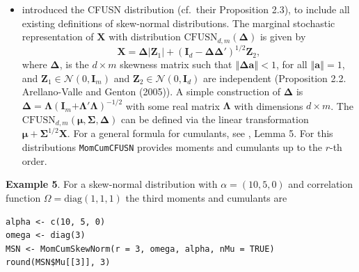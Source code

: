 \begin{itemize}
\[{  }\right)  \right)  , \quad\mathbf{X} \in\mathbb{R}^{d},
  \]
  where \(\varphi\left(\mathbf{X};\boldsymbol{\mu},\boldsymbol{\Omega}\right)\) is the \(d\)-dimensional normal density with mean \(\boldsymbol{\mu}\)
  and correlation matrix \(\boldsymbol{\Omega}\); here \(\varphi\) and \(\Phi\) denote
  the univariate standard normal density and the cdf. For a general formula for cumulants, see \citet{jamma2021San}, Lemma 4. For this distribution are available the functions \texttt{MomCumSkewNorm}, which computes the theoretical values of moments and cumulants up to the r-th order and \texttt{EVSKSkewNorm} which gives mean vector, covariance, skewness and kurtosis vectors and other features.
\item
  \citet{arellano2005fundamental} introduced the
  CFUSN distribution (cf.~their Proposition 2.3), to include all
  existing definitions of skew-normal distributions. The marginal stochastic
  representation of \(\mathbf{X}\) with distribution \(\text{CFUSN}_{d,m}\left(\boldsymbol{\Delta}\right)\) is given by
  \[
    \mathbf{X}=\boldsymbol{\Delta}\left\vert \mathbf{Z}_{1}\right\vert
    +\left(  \mathbf{I}_{d}-\boldsymbol{\Delta\Delta}'\right)
    ^{1/2}\mathbf{Z}_{2}, 
  \]
  where \(\boldsymbol{\Delta}\), is the \(d\times m\) skewness matrix such that
  \(\left\Vert \boldsymbol{\Delta}\mathbf{a}\right\Vert <1\), for all
  \(\left\Vert \mathbf{a}\right\Vert =1\), and \(\mathbf{Z}_{1}\in\mathcal{N}\left( 0,\mathbf{I}_{m}\right)\) and \(\mathbf{Z}_{2}\in\mathcal{N}\left( 0,\mathbf{I}_{d}\right)\) are independent (Proposition 2.2. Arellano-Valle and Genton (2005)). A simple construction of
  \(\boldsymbol{\Delta}\) is \(\boldsymbol{\Delta}=\boldsymbol{\Lambda}\left(\mathbf{I}_{m}\mathbf{+}\boldsymbol{\Lambda}' \boldsymbol{\Lambda}\right)^{-1/2}\) with some real matrix \(\boldsymbol{\Lambda}\) with dimensions \(d\times m\). The \(\text{CFUSN}_{d,m}\left(\boldsymbol{\mu},\boldsymbol{\Sigma},\boldsymbol{\Delta}\right)\) can be defined via the linear transformation
  \(\boldsymbol{\mu}+\boldsymbol{\Sigma}^{1/2}\mathbf{X}\). For a general formula for cumulants, see \citet{jamma2021San}, Lemma 5. For this distributions \texttt{MomCumCFUSN} provides moments and cumulants up to the \(r\)-th order.
\end{itemize}

\textbf{Example 5}. For a skew-normal distribution with \(\alpha=(10,5,0)\) and correlation function \(\Omega= \text{diag} (1,1,1)\) the third moments and cumulants are

\begin{verbatim}
alpha <- c(10, 5, 0)
omega <- diag(3)
MSN <- MomCumSkewNorm(r = 3, omega, alpha, nMu = TRUE)
round(MSN$Mu[[3]], 3)
\end{verbatim}

